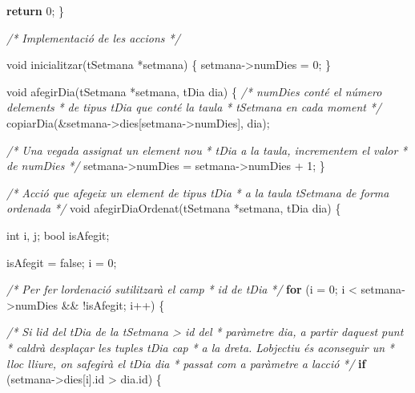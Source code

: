 \documentclass[]{book}
\newenvironment{Shaded}{\begin{snugshade}}{\end{snugshade}}
\newcommand{\CommentTok}[1]{\textcolor[rgb]{0.56,0.35,0.01}{\textit{#1}}}
\newcommand{\ControlFlowTok}[1]{\textcolor[rgb]{0.13,0.29,0.53}{\textbf{#1}}}
\newcommand{\DataTypeTok}[1]{\textcolor[rgb]{0.13,0.29,0.53}{#1}}
\newcommand{\DecValTok}[1]{\textcolor[rgb]{0.00,0.00,0.81}{#1}}
\newcommand{\NormalTok}[1]{#1}
\begin{document}
\begin{Shaded}
\begin{Highlighting}[]
    \ControlFlowTok{return} \DecValTok{0}\NormalTok{;}
\NormalTok{\}}

\CommentTok{/* Implementació de les accions */}

\DataTypeTok{void}\NormalTok{ inicialitzar(tSetmana *setmana) \{}
\NormalTok{    setmana{-}\textgreater{}numDies = }\DecValTok{0}\NormalTok{;}
\NormalTok{\}}

\DataTypeTok{void}\NormalTok{ afegirDia(tSetmana *setmana, tDia dia) \{}
    \CommentTok{/* numDies conté el número d\textquotesingle{}elements }
\CommentTok{     * de tipus tDia que conté la taula }
\CommentTok{     * tSetmana en cada moment }
\CommentTok{     */}
\NormalTok{    copiarDia(\&setmana{-}\textgreater{}dies[setmana{-}\textgreater{}numDies], dia);}

    \CommentTok{/* Una vegada assignat un element nou }
\CommentTok{     * tDia a la taula, incrementem el valor }
\CommentTok{     * de numDies }
\CommentTok{     */}
\NormalTok{    setmana{-}\textgreater{}numDies = setmana{-}\textgreater{}numDies + }\DecValTok{1}\NormalTok{;}
\NormalTok{\}}

\CommentTok{/* Acció que afegeix un element de tipus tDia}
\CommentTok{ * a la taula tSetmana de forma ordenada }
\CommentTok{ */}
\DataTypeTok{void}\NormalTok{ afegirDiaOrdenat(tSetmana *setmana, tDia dia) \{}
    
    \DataTypeTok{int}\NormalTok{ i, j;}
    \DataTypeTok{bool}\NormalTok{ isAfegit;}
    
\NormalTok{    isAfegit = false;}
\NormalTok{    i = }\DecValTok{0}\NormalTok{;}
    
    \CommentTok{/* Per fer l\textquotesingle{}ordenació s\textquotesingle{}utilitzarà el camp}
\CommentTok{     * id de tDia }
\CommentTok{     */}
    \ControlFlowTok{for}\NormalTok{ (i = }\DecValTok{0}\NormalTok{; i \textless{} setmana{-}\textgreater{}numDies \&\& !isAfegit; i++) \{}
        
        \CommentTok{/* Si l\textquotesingle{}id del tDia de la tSetmana \textgreater{} id del}
\CommentTok{         * paràmetre dia, a partir d\textquotesingle{}aquest punt }
\CommentTok{         * caldrà desplaçar les tuples tDia cap }
\CommentTok{         * a la dreta. L\textquotesingle{}objectiu és aconseguir un}
\CommentTok{         * lloc lliure, on s\textquotesingle{}afegirà el tDia dia }
\CommentTok{         * passat com a paràmetre a l\textquotesingle{}acció}
\CommentTok{         */}
        \ControlFlowTok{if}\NormalTok{ (setmana{-}\textgreater{}dies[i].id \textgreater{} dia.id) \{}
            

\end{Highlighting}
\end{Shaded}
\end{document}

